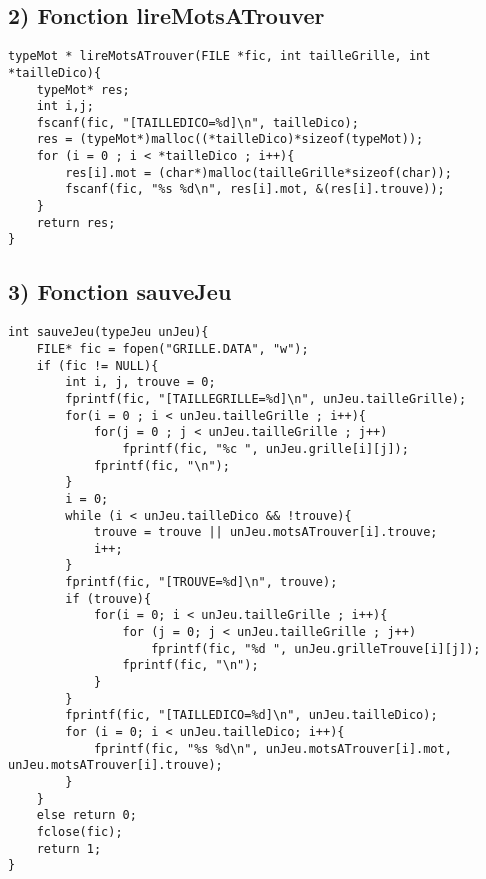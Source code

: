 \documentclass[a4paper,11pt]{article}
\begin{document}
\subsection*{2) Fonction lireMotsATrouver}
\begin{lstlisting}[caption=La fonction lireMotsATrouver]
typeMot * lireMotsATrouver(FILE *fic, int tailleGrille, int *tailleDico){
	typeMot* res;
	int i,j;
	fscanf(fic, "[TAILLEDICO=%d]\n", tailleDico);
	res = (typeMot*)malloc((*tailleDico)*sizeof(typeMot));
	for (i = 0 ; i < *tailleDico ; i++){
		res[i].mot = (char*)malloc(tailleGrille*sizeof(char));
		fscanf(fic, "%s %d\n", res[i].mot, &(res[i].trouve));
	}
	return res;
}
\end{lstlisting}

\subsection*{3) Fonction sauveJeu}
\begin{lstlisting}[caption=La fonction sauveJeu]
int sauveJeu(typeJeu unJeu){
	FILE* fic = fopen("GRILLE.DATA", "w");
	if (fic != NULL){
		int i, j, trouve = 0;
		fprintf(fic, "[TAILLEGRILLE=%d]\n", unJeu.tailleGrille);
		for(i = 0 ; i < unJeu.tailleGrille ; i++){
			for(j = 0 ; j < unJeu.tailleGrille ; j++)
				fprintf(fic, "%c ", unJeu.grille[i][j]);
			fprintf(fic, "\n");
		}
		i = 0;
		while (i < unJeu.tailleDico && !trouve){
			trouve = trouve || unJeu.motsATrouver[i].trouve;
			i++;
		}
		fprintf(fic, "[TROUVE=%d]\n", trouve);
		if (trouve){
			for(i = 0; i < unJeu.tailleGrille ; i++){
				for (j = 0; j < unJeu.tailleGrille ; j++)
					fprintf(fic, "%d ", unJeu.grilleTrouve[i][j]);
				fprintf(fic, "\n");
			}
		}
		fprintf(fic, "[TAILLEDICO=%d]\n", unJeu.tailleDico);
		for (i = 0; i < unJeu.tailleDico; i++){
			fprintf(fic, "%s %d\n", unJeu.motsATrouver[i].mot, unJeu.motsATrouver[i].trouve);
		}
	}
	else return 0;
	fclose(fic);
	return 1;
}
\end{lstlisting}

\end{document}
